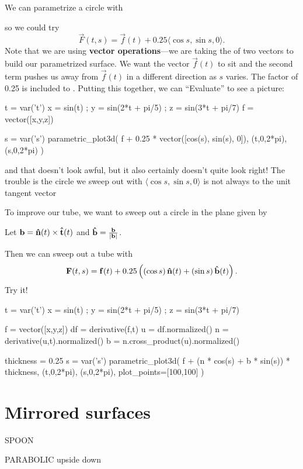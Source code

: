 \documentclass{ximera}
\begin{document}
\begin{example}
  We can parametrize a circle with
  \begin{multipleChoice}
  \end{multipleChoice}
  so we could try
  \[
    \vec{F}(t,s) = \vec{f}(t) + 0.25 \langle \cos s, \sin s, 0 \rangle.
  \]
  Note that we are using \textbf{vector operations}---we are taking the
 of two vectors to build our parametrized surface.  We want the vector $\vec{f}(t)$ to sit  and the second term pushes us away from $\vec{f}(t)$ in a different direction as $s$ varies.  The factor of 0.25 is included to .  Putting this together, we can ``Evaluate'' to see a picture:
  \begin{sageCell}
t = var('t')
x = sin(t) ; y = sin(2*t + pi/5) ; z = sin(3*t + pi/7)
f = vector([x,y,z])

s = var('s')
parametric_plot3d( f + 0.25 * vector([cos(s), sin(s), 0]), (t,0,2*pi), (s,0,2*pi) )
\end{sageCell}
and that doesn't look awful, but it also certainly doesn't quite look
right!  The trouble is the circle we sweep out with
$\langle \cos s, \sin s, 0 \rangle$ is not always
 to the
unit tangent vector
\begin{multipleChoice}
\end{multipleChoice}

To improve our tube, we want to sweep out a circle in the plane given by
\begin{multipleChoice}
\end{multipleChoice}
Let $\mathbf{b} = \mathbf{\hat{n}}(t) \times \mathbf{\hat{t}}(t)$ and $\mathbf{\hat{b}} = \frac{\mathbf{b}}{| \mathbf{b} |}$.

Then we can sweep out a tube with
  \[
    \mathbf{F}(t,s) = \mathbf{f}(t) + 0.25 \left( \left( \cos s \right) \mathbf{\hat{n}}(t) + \left( \sin s \right) \mathbf{\hat{b}}(t) \right).
  \]
  Try it!
\begin{sageCell}
t = var('t')
x = sin(t) ; y = sin(2*t + pi/5) ; z = sin(3*t + pi/7)

f = vector([x,y,z])
df = derivative(f,t)
u = df.normalized()
n = derivative(u,t).normalized()
b = n.cross_product(u).normalized()

thickness = 0.25
s = var('s')
parametric_plot3d( f + (n * cos(s) + b * sin(s)) * thickness, (t,0,2*pi), (s,0,2*pi), plot_points=[100,100] )
\end{sageCell}

\end{example}  

\section{Mirrored surfaces}

SPOON

PARABOLIC
upside down
\end{document}
